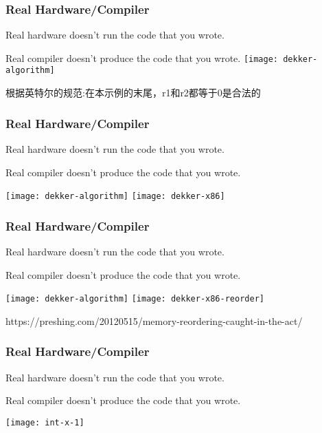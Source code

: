 \begin{frame}
    \frametitle{Real Hardware/Compiler}
    Real hardware doesn’t run the code that you wrote.
    
    Real compiler doesn’t produce the code that you wrote.
    \texttt{[image: dekker-algorithm]}
    
    根据英特尔的规范:在本示例的末尾，r1和r2都等于0是合法的
\end{frame}

\begin{frame}
    \frametitle{Real Hardware/Compiler}
    Real hardware doesn’t run the code that you wrote.
    
    Real compiler doesn’t produce the code that you wrote.
    
    \centering
    \texttt{[image: dekker-algorithm]}
    \texttt{[image: dekker-x86]}
\end{frame}

\begin{frame}
    \frametitle{Real Hardware/Compiler}
    Real hardware doesn’t run the code that you wrote.
    
    Real compiler doesn’t produce the code that you wrote.
    
    \centering
    \texttt{[image: dekker-algorithm]}
    \texttt{[image: dekker-x86-reorder]}
    
    \tiny
    https://preshing.com/20120515/memory-reordering-caught-in-the-act/
\end{frame}

\begin{frame}
    \frametitle{Real Hardware/Compiler}
    Real hardware doesn’t run the code that you wrote.
    
    Real compiler doesn’t produce the code that you wrote.
    
    \centering
    \texttt{[image: int-x-1]}

\end{frame}

